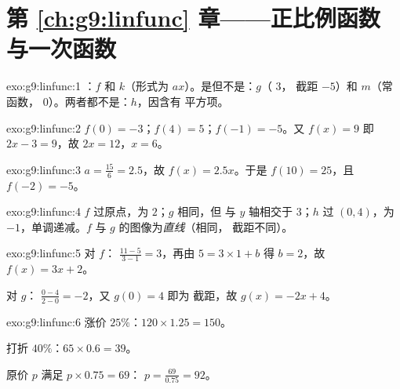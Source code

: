 \section*{第 \ref{ch:g9:linfunc} 章——正比例函数与一次函数}

\begin{solution}{exo:g9:linfunc:1}
：$f$ 和 $k$（形式为 $ax$）。是但不是：$g$（ $3$，
截距 $-5$）和 $m$（常函数， $0$）。两者都不是：$h$，因含有
平方项。
\end{solution}

\begin{solution}{exo:g9:linfunc:2}
$f(0) = -3$；$f(4) = 5$；$f(-1) = -5$。又 $f(x) = 9$ 即
$2x - 3 = 9$，故 $2x = 12$，$x = 6$。
\end{solution}

\begin{solution}{exo:g9:linfunc:3}
$a = \frac{15}{6} = 2.5$，故 $f(x) = 2.5x$。于是 $f(10) = 25$，且
$f(-2) = -5$。
\end{solution}

\begin{solution}{exo:g9:linfunc:4}
$f$ 过原点，为 $2$；$g$ 相同，但
与 $y$ 轴相交于 $3$；$h$ 过 $(0, 4)$，为
$-1$，单调递减。$f$ 与 $g$ 的图像为\emph{直线}（相同，
截距不同）。
\end{solution}

\begin{solution}{exo:g9:linfunc:5}
对 $f$： $\frac{11 - 5}{3 - 1} = 3$，再由 $5 = 3 \times 1 + b$
得 $b = 2$，故 $f(x) = 3x + 2$。

对 $g$： $\frac{0 - 4}{2 - 0} = -2$，又 $g(0) = 4$ 即为
截距，故 $g(x) = -2x + 4$。
\end{solution}

\begin{solution}{exo:g9:linfunc:6}
涨价 $25\%$：$120 \times 1.25 = 150$。

打折 $40\%$：$65 \times 0.6 = 39$。

原价 $p$ 满足 $p \times 0.75 = 69$：
$p = \frac{69}{0.75} = 92$。
\end{solution}

